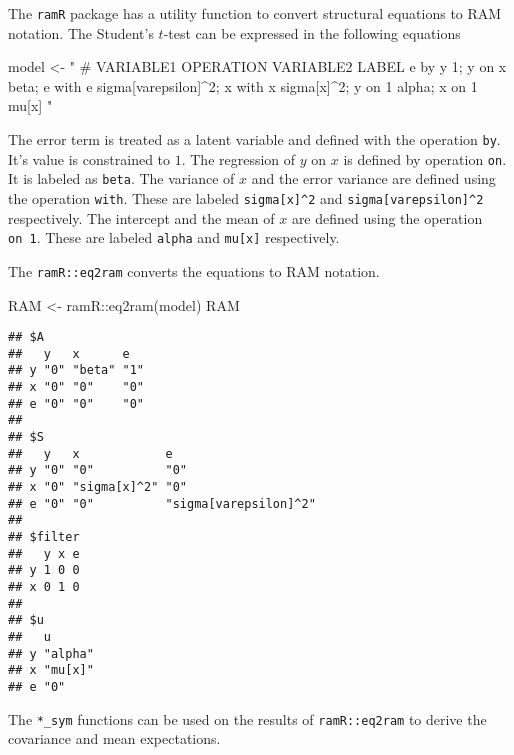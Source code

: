 \documentclass[
]{book}
\newenvironment{Shaded}{\begin{snugshade}}{\end{snugshade}}
\newcommand{\FunctionTok}[1]{\textcolor[rgb]{0.00,0.00,0.00}{#1}}
\newcommand{\NormalTok}[1]{#1}
\newcommand{\OtherTok}[1]{\textcolor[rgb]{0.56,0.35,0.01}{#1}}
\newcommand{\SpecialCharTok}[1]{\textcolor[rgb]{0.00,0.00,0.00}{#1}}
\newcommand{\StringTok}[1]{\textcolor[rgb]{0.31,0.60,0.02}{#1}}
\theoremstyle{definition}
\theoremstyle{definition}
\theoremstyle{definition}
\theoremstyle{remark}
\begin{document}
The \texttt{ramR} package has a utility function to convert structural equations to RAM notation.
The Student's \(t\)-test can be expressed in the following equations

\begin{Shaded}
\begin{Highlighting}[]
\NormalTok{model }\OtherTok{\textless{}{-}} \StringTok{"}
\StringTok{  \# VARIABLE1 OPERATION VARIABLE2 LABEL}
\StringTok{  e           by        y         1;}
\StringTok{  y           on        x         beta;}
\StringTok{  e           with      e         sigma[varepsilon]\^{}2;}
\StringTok{  x           with      x         sigma[x]\^{}2;}
\StringTok{  y           on        1         alpha;}
\StringTok{  x           on        1         mu[x]}
\StringTok{"}
\end{Highlighting}
\end{Shaded}

The error term is treated as a latent variable and defined with the operation \texttt{by}.
It's value is constrained to \(1\).
The regression of \(y\) on \(x\) is defined by operation \texttt{on}.
It is labeled as \texttt{beta}.
The variance of \(x\) and the error variance are defined using the operation \texttt{with}.
These are labeled \texttt{sigma{[}x{]}\^{}2} and \texttt{sigma{[}varepsilon{]}\^{}2} respectively.
The intercept and the mean of \(x\) are defined using the operation \texttt{on\ 1}.
These are labeled \texttt{alpha} and \texttt{mu{[}x{]}} respectively.

The \texttt{ramR::eq2ram} converts the equations to RAM notation.

\begin{Shaded}
\begin{Highlighting}[]
\NormalTok{RAM }\OtherTok{\textless{}{-}}\NormalTok{ ramR}\SpecialCharTok{::}\FunctionTok{eq2ram}\NormalTok{(model)}
\NormalTok{RAM}
\end{Highlighting}
\end{Shaded}

\begin{verbatim}
## $A
##   y   x      e  
## y "0" "beta" "1"
## x "0" "0"    "0"
## e "0" "0"    "0"
## 
## $S
##   y   x            e                    
## y "0" "0"          "0"                  
## x "0" "sigma[x]^2" "0"                  
## e "0" "0"          "sigma[varepsilon]^2"
## 
## $filter
##   y x e
## y 1 0 0
## x 0 1 0
## 
## $u
##   u      
## y "alpha"
## x "mu[x]"
## e "0"
\end{verbatim}

The \texttt{*\_sym} functions can be used on the results of \texttt{ramR::eq2ram}
to derive the covariance and mean expectations.
\end{document}
